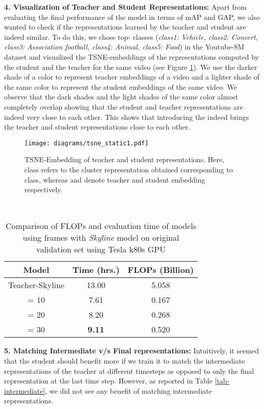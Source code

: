 \documentclass[10pt,twocolumn,letterpaper]{article}
\newcommand{\full}{Teacher-Skyline}
\begin{document}
\noindent\textbf{4. Visualization of Teacher and Student Representations:} Apart from evaluating the final performance of the model in terms of mAP and GAP, we also wanted to check if the representations learned by the teacher and student are indeed similar. To do this, we chose top- classes (\textit{class1: Vehicle, class2: Concert, class3: Association football, class4: Animal, class5: Food}) in the Youtube-8M dataset and visualized the TSNE-embeddings of the representations computed by the student and the teacher for the same video (see Figure \ref{tsne}). We use the darker shade of a color to represent teacher embeddings of a video and a lighter shade of the same color to represent the student embeddings of the same video. We observe that the dark shades and the light shades of the same color almost completely overlap showing that the student and teacher representations are indeed very close to each other. This shows that introducing the  indeed brings the teacher and student representations close to each other. 
\begin{figure}[t]
\centering
\texttt{[image: diagrams/tsne\_static1.pdf]}
\caption{TSNE-Embedding of teacher and student representations. Here, class  refers to the cluster representation obtained corresponding to  class, whereas  and  denote teacher and student embedding respectively.}\label{tsne}
\end{figure}\\
\begin{table}[h]
\begin{tabular}{c|c|c}
\toprule
Model  & Time (hrs.) & FLOPs (Billion)\\
\toprule
\full & 13.00 & 5.058 \\
\midrule
= 10 & 7.61 & 0.167\\
= 20 & 8.20 & 0.268\\
= 30 & \textbf{9.11} & 0.520\\
\bottomrule
\end{tabular}
\caption{Comparison of FLOPs and evaluation time of models using  frames with \textit{Skyline} model on original validation set using Tesla k80s GPU}
\label{tab-flops}
\end{table}

\noindent\textbf{5. Matching Intermediate v/s Final representations:} Intuitively, it seemed that the student should benefit more if we train it to match the intermediate representations of the teacher at different timesteps as opposed to only the final representation at the last time step. However, as reported in Table \ref{tab-intermediate}, we did not see any benefit of matching intermediate representations. 
\end{document}
